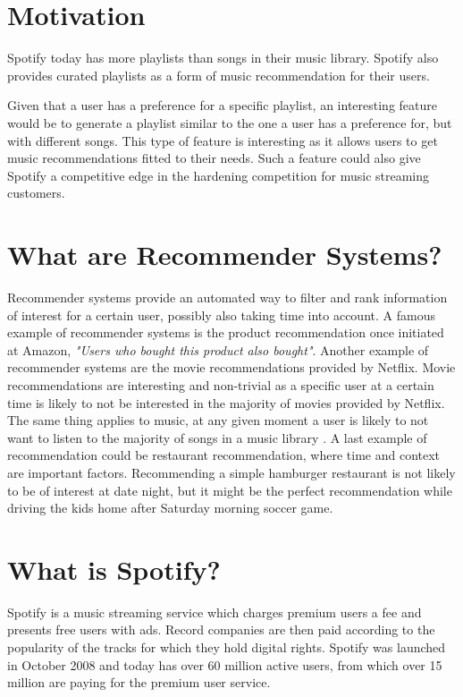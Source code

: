 \section{Motivation}
Spotify today has more playlists than songs in their music library. Spotify also provides curated playlists as a form of music recommendation for their users. 

Given that a user has a preference for a specific playlist, an interesting feature would be to generate a playlist similar to the one a user has a preference for, but with different songs. This type of feature is interesting as it allows users to get music recommendations fitted to their needs. Such a feature could also give Spotify a competitive edge in the hardening competition for music streaming customers.

\section{What are Recommender Systems?}
Recommender systems provide an automated way to filter and rank information of interest for a certain user, possibly also taking time into account. A famous example of recommender systems is the product recommendation once initiated at Amazon, \textit{"Users who bought this product also bought"}. Another example of recommender systems are the movie recommendations provided by Netflix. Movie recommendations are interesting and non-trivial as a specific user at a certain time is likely to not be interested in the majority of movies provided by Netflix. The same thing applies to music, at any given moment a user is likely to not want to listen to the majority of songs in a music library . A last example of recommendation could be restaurant recommendation, where time and context are important factors. Recommending a simple hamburger restaurant is not likely to be of interest at date night, but it might be the perfect recommendation while driving the kids home after Saturday morning soccer game.

\section{What is Spotify?}
Spotify is a music streaming service which charges premium users a fee and presents free users with ads. Record companies are then paid according to the popularity of the tracks for which they hold digital rights. Spotify was launched in October 2008 and today has over 60 million active users, from which over 15 million are paying for the premium user service.

